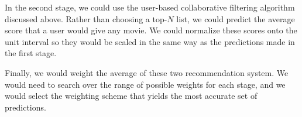 In the second stage, we could use the user-based collaborative filtering algorithm discussed above. Rather than choosing a top-$N$ list, we could predict the average score that a user would give any movie. We could normalize these scores onto the unit interval so they would be scaled in the same way as the predictions made in the first stage.

Finally, we would weight the average of these two recommendation system. We would need to search over the range of possible weights for each stage, and we would select the weighting scheme that yields the most accurate set of predictions.





% 


